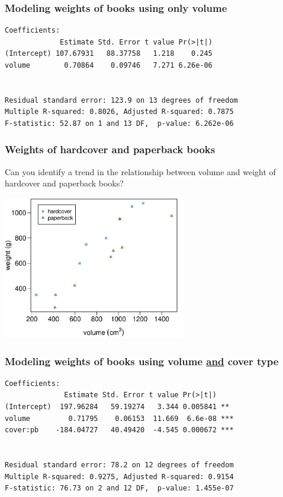 \documentclass{beamer}
\begin{document}

\begin{frame}[fragile]
\frametitle{Modeling weights of books using only volume}

\begin{verbatim}
Coefficients:
             Estimate Std. Error t value Pr(>|t|)    
(Intercept) 107.67931   88.37758   1.218    0.245    
volume        0.70864    0.09746   7.271 6.26e-06


Residual standard error: 123.9 on 13 degrees of freedom
Multiple R-squared: 0.8026,	Adjusted R-squared: 0.7875 
F-statistic: 52.87 on 1 and 13 DF,  p-value: 6.262e-06 
\end{verbatim}

\end{frame}


\begin{frame}
\frametitle{Weights of hardcover and paperback books}

Can you identify a trend in the relationship between volume and weight of hardcover and paperback books?


\begin{center}
\includegraphics[width=0.6\textwidth]{plots/weight_volume_cover}
\end{center}

\end{frame}


\begin{frame}[fragile]
\frametitle{Modeling weights of books using volume \underline{and} cover type}

\begin{verbatim}
Coefficients:
              Estimate Std. Error t value Pr(>|t|)    
(Intercept)  197.96284   59.19274   3.344 0.005841 ** 
volume         0.71795    0.06153  11.669  6.6e-08 ***
cover:pb    -184.04727   40.49420  -4.545 0.000672 ***


Residual standard error: 78.2 on 12 degrees of freedom
Multiple R-squared: 0.9275,	Adjusted R-squared: 0.9154 
F-statistic: 76.73 on 2 and 12 DF,  p-value: 1.455e-07 
\end{verbatim}

\end{frame}
\end{document}
